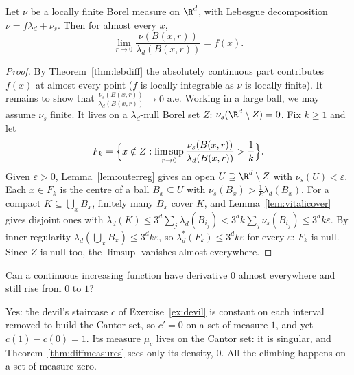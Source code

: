 \begin{theorem}\label{thm:diffmeasures}
Let $\nu$ be a locally finite Borel measure on $\R^d$, with Lebesgue decomposition $\nu=f\lambda_d+\nu_s$. Then for almost every $x$,
\[\lim_{r\to0}\frac{\nu(B(x,r))}{\lambda_d(B(x,r))}=f(x).\]
\end{theorem}
\begin{proof}
By Theorem~\ref{thm:lebdiff} the absolutely continuous part contributes $f(x)$ at almost every point ($f$ is locally integrable as $\nu$ is locally finite). It remains to show that
$\frac{\nu_s(B(x,r))}{\lambda_d(B(x,r))}\to0$ a.e. Working in a large ball, we may assume $\nu_s$ finite. It lives on a $\lambda_d$-null Borel set $Z$: $\nu_s(\R^d\setminus Z)=0$. Fix $k\ge1$ and let
\[F_k=\Bigl\{x\notin Z:\limsup_{r\to0}\frac{\nu_s(B(x,r))}{\lambda_d(B(x,r))}>\frac1k\Bigr\}.\]
Given $\varepsilon>0$, Lemma~\ref{lem:outerreg} gives an open $U\supseteq\R^d\setminus Z$ with $\nu_s(U)<\varepsilon$. Each $x\in F_k$ is the centre of a ball $B_x\subseteq U$ with $\nu_s(B_x)>\frac1k\lambda_d(B_x)$. For a compact
$K\subseteq\bigcup_xB_x$, finitely many $B_x$ cover $K$, and Lemma~\ref{lem:vitalicover} gives disjoint ones with $\lambda_d(K)\le3^d\sum_j\lambda_d(B_{i_j})<3^dk\sum_j\nu_s(B_{i_j})\le3^dk\varepsilon$. By inner regularity
$\lambda_d(\bigcup_xB_x)\le3^dk\varepsilon$, so $\lambda_d^*(F_k)\le3^dk\varepsilon$ for every $\varepsilon$: $F_k$ is null. Since $Z$ is null too, the $\limsup$ vanishes almost everywhere.
\end{proof}

\begin{think}
Can a continuous increasing function have derivative $0$ almost everywhere and still rise from $0$ to $1$?
\end{think}

Yes: the devil's staircase $c$ of Exercise~\ref{ex:devil} is constant on each interval removed to build the Cantor set, so $c'=0$ on a set of measure $1$, and yet $c(1)-c(0)=1$. Its measure $\mu_c$ lives on the
Cantor set: it is singular, and Theorem~\ref{thm:diffmeasures} sees only its density, $0$. All the climbing happens on a set of measure zero.

